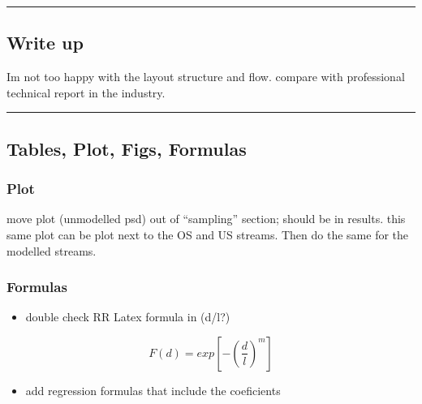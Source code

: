 \documentclass[
]{article}
\providecommand{\tightlist}{%
  \setlength{\itemsep}{0pt}\setlength{\parskip}{0pt}}
\begin{document}
\begin{center}\rule{0.5\linewidth}{0.5pt}\end{center}

\hypertarget{write-up}{%
\subsection{Write up}\label{write-up}}

Im not too happy with the layout structure and flow. compare with
professional technical report in the industry.

\begin{center}\rule{0.5\linewidth}{0.5pt}\end{center}

\hypertarget{tables-plot-figs-formulas}{%
\subsection{Tables, Plot, Figs,
Formulas}\label{tables-plot-figs-formulas}}

\hypertarget{plot}{%
\subsubsection{Plot}\label{plot}}

move plot (unmodelled psd) out of ``sampling'' section; should be in
results. this same plot can be plot next to the OS and US streams. Then
do the same for the modelled streams.

\hypertarget{formulas}{%
\subsubsection{Formulas}\label{formulas}}

\begin{itemize}
\tightlist
\item
  double check RR Latex formula in (d/l?)
\end{itemize}

\begin{equation}

  F\left(d\right) = exp\left[-(\frac{d}{l})^{m} \right]

  \label{eq : RR}
\end{equation}

\begin{itemize}
\tightlist
\item
  add regression formulas that include the coeficients
\end{itemize}
\end{document}

